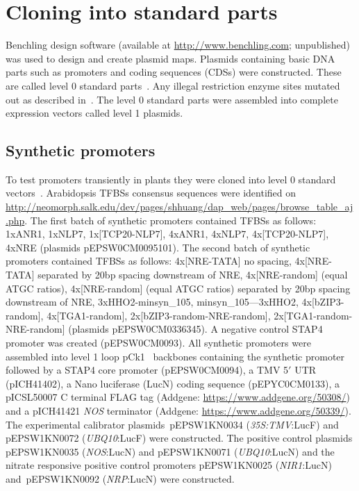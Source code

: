 \documentclass[../main.tex]{subfiles}
\begin{document}
\section{Cloning into standard parts}\label{chapter2:methods:cloning-into-standard-parts}

Benchling design software (available at \url{http://www.benchling.com}; unpublished) was used to design and create plasmid maps.
Plasmids containing basic DNA parts such as promoters and coding sequences (CDSs) were constructed.
These are called level 0 standard parts~\autocite{marillonnetSyntheticDNAAssembly2020}.
Any illegal restriction enzyme sites mutated out as described in~\textcite*{patronStandardsPlantSynthetic2015}.
The level 0 standard parts were assembled into complete expression vectors called level 1 plasmids.

\subsection{Synthetic promoters}\label{chapter2:methods:synthetic-promoters}

To test promoters transiently in plants they were cloned into level 0 standard vectors~\autocite{marillonnetSyntheticDNAAssembly2020}.
Arabidopsis TFBSs consensus sequences were identified on \url{http://neomorph.salk.edu/dev/pages/shhuang/dap_web/pages/browse_table_aj.php}.
The first batch of synthetic promoters contained TFBSs as follows: 1xANR1, 1xNLP7, 1x[TCP20-NLP7], 4xANR1, 4xNLP7, 4x[TCP20-NLP7], 4xNRE (plasmids pEPSW0CM0095\textendash{}101).
The second batch of synthetic promoters contained TFBSs as follows: 4x[NRE-TATA] no spacing, 4x[NRE-TATA] separated by 20bp spacing downstream of NRE, 4x[NRE-random] (equal ATGC ratios), 4x[NRE-random] (equal ATGC ratios) separated by 20bp spacing downstream of NRE, 3xHHO2-minsyn\_105, minsyn\_105—3xHHO2, 4x[bZIP3-random], 4x[TGA1-random], 2x[bZIP3-random-NRE-random], 2x[TGA1-random-NRE-random] (plasmids pEPSW0CM0336\textendash{}345).
A negative control STAP4 promoter was created (pEPSW0CM0093).
All synthetic promoters were assembled into level 1  loop pCk1~\autocite{pollakLoopAssemblySimple2018} backbones containing the synthetic promoter followed by a STAP4 core promoter (pEPSW0CM0094), a TMV 5$\prime$ UTR (pICH41402), a Nano luciferase (LucN) coding sequence (pEPYC0CM0133), a pICSL50007 C terminal FLAG tag (Addgene: \url{https://www.addgene.org/50308/}) and a pICH41421 \textit{NOS} terminator (Addgene: \url{https://www.addgene.org/50339/}).
The experimental calibrator plasmids~pEPSW1KN0034 (\textit{35S:TMV}:LucF) and pEPSW1KN0072 (\textit{UBQ10}:LucF) were constructed.
The positive control plasmids pEPSW1KN0035 (\textit{NOS}:LucN) and pEPSW1KN0071 (\textit{UBQ10}:LucN) and the nitrate responsive positive control promoters pEPSW1KN0025 (\textit{NIR1}:LucN) and~pEPSW1KN0092 (\textit{NRP}:LucN) were constructed.
\end{document}
